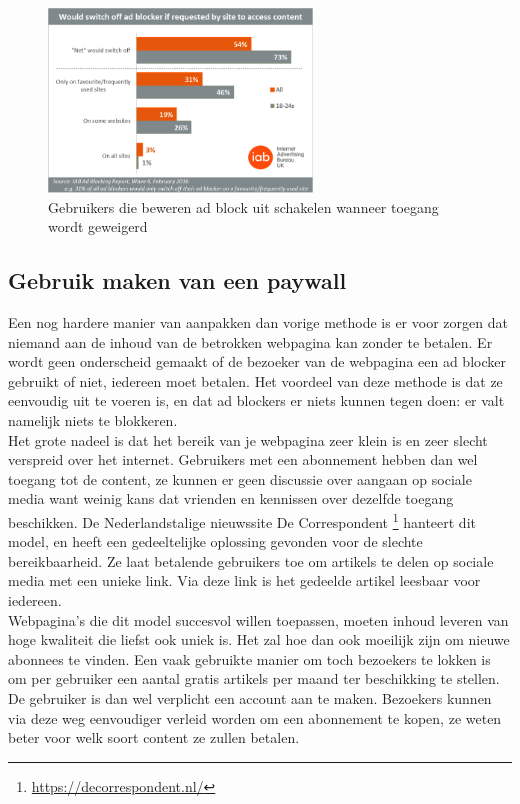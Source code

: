 \documentclass[pdftex,a4paper,12pt,twoside]{report}
\begin{document}
\begin{figure}
\centering
\includegraphics[width=7cm]{img/Adblockblock}
\caption{Gebruikers die beweren ad block uit schakelen wanneer toegang wordt geweigerd}
\label{fig: Adblockblock}
\end{figure}

\subsection{Gebruik maken van een paywall}
\label{sec Gebruik maken van een paywall}
Een nog hardere manier van aanpakken dan vorige methode is er voor zorgen dat niemand aan de inhoud van de betrokken webpagina kan zonder te betalen. Er wordt geen onderscheid gemaakt of de bezoeker van de webpagina een ad blocker gebruikt of niet, iedereen moet betalen. Het voordeel van deze methode is dat ze eenvoudig uit te voeren is, en dat ad blockers er niets kunnen tegen doen: er valt namelijk niets te blokkeren.
\\
Het grote nadeel is dat het bereik van je webpagina zeer klein is en zeer slecht verspreid over het internet. Gebruikers met een abonnement hebben dan wel toegang tot de content, ze kunnen er geen discussie over aangaan op sociale media want weinig kans dat vrienden en kennissen over dezelfde toegang beschikken. De Nederlandstalige nieuwssite De Correspondent \footnote{\url{https://decorrespondent.nl/}} hanteert dit model, en heeft een gedeeltelijke oplossing gevonden voor de slechte bereikbaarheid. Ze laat betalende gebruikers toe om artikels te delen op sociale media met een unieke link. Via deze link is het gedeelde artikel leesbaar voor iedereen.
\\ 
Webpagina's die dit model succesvol willen toepassen, moeten inhoud leveren van hoge kwaliteit die liefst ook uniek is. Het zal hoe dan ook moeilijk zijn om nieuwe abonnees te vinden. Een vaak gebruikte manier om toch bezoekers te lokken is om per gebruiker een aantal gratis artikels per maand ter beschikking te stellen. De gebruiker is dan wel verplicht een account aan te maken. Bezoekers kunnen via deze weg eenvoudiger verleid worden om een abonnement te kopen, ze weten beter voor welk soort content ze zullen betalen.
\end{document}
